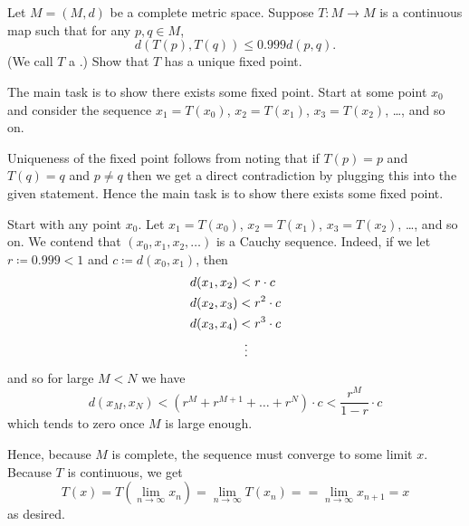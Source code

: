 \section{\problemhead}
\begin{dproblem}
	Let $M = (M,d)$ be a complete metric space.
	Suppose $T \colon M \to M$ is a continuous map
	such that for any $p, q \in M$,
	\[ d\left( T(p), T(q) \right) \le 0.999 d(p,q). \]
	(We call $T$ a .)
	Show that $T$ has a unique fixed point.
	\begin{hint}
		The main task is to show there exists some fixed point.
		Start at some point $x_0$ and consider the sequence
		$x_1 = T(x_0)$, $x_2 = T(x_1)$, $x_3 = T(x_2)$, \dots, and so on.
	\end{hint}
	\begin{sol}
		Uniqueness of the fixed point follows from noting that if $T(p) = p$ and $T(q) = q$
		and $p \neq q$ then we get a direct contradiction by plugging this into the given statement.
		Hence the main task is to show there exists some fixed point.

		Start with any point $x_0$.
		Let $x_1 = T(x_0)$, $x_2 = T(x_1)$, $x_3 = T(x_2)$, \dots, and so on.
		We contend that $(x_0, x_1, x_2, \dots)$ is a Cauchy sequence.
		Indeed, if we let $r \coloneqq 0.999 < 1$ and $c \coloneqq d(x_0, x_1)$, then
		\begin{align*}
			d(x_1, x_2) &< r \cdot c \\
			d(x_2, x_3) &< r^2 \cdot c \\
			d(x_3, x_4) &< r^3 \cdot c \\
			&\vdotswithin< \\
		\end{align*}
		and so for large $M < N$ we have
		\[ d(x_M, x_N) < \left( r^M + r^{M+1} + \dots + r^N \right) \cdot c
			< \frac{r^M}{1-r} \cdot c
		\]
		which tends to zero once $M$ is large enough.

		Hence, because $M$ is complete, the sequence must converge to some limit $x$.
		Because $T$ is continuous, we get
		\[ T(x) = T\left( \lim_{n \to \infty} x_n \right)
			= \lim_{n \to \infty} T(x_n) =
			= \lim_{n \to \infty} x_{n+1} = x \]
		as desired.
	\end{sol}
\end{dproblem}

